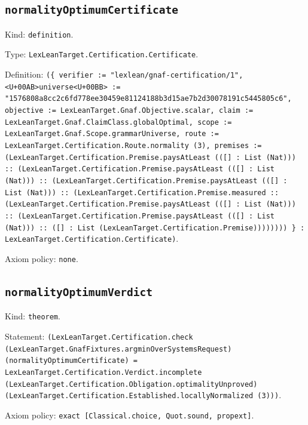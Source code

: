 \documentclass[11pt]{article}
\begin{document}
\subsection*{\texttt{normalityOptimumCertificate}}
\noindent Kind: \texttt{definition}.\par
\noindent Type: \texttt{LexLeanTarget.Certification.Certificate}.\par
\noindent Definition: \texttt{(\{ verifier := "lexlean/gnaf-certification/1", <U+00AB>universe<U+00BB> := "1576808a8cc2c6fd778ee30459e81124188b3d15ae7b2d30078191c5445805c6", objective := LexLeanTarget.Gnaf.Objective.scalar, claim := LexLeanTarget.Gnaf.ClaimClass.globalOptimal, scope := LexLeanTarget.Gnaf.Scope.grammarUniverse, route := LexLeanTarget.Certification.Route.normality (3), premises := (LexLeanTarget.Certification.Premise.paysAtLeast (([] : List (Nat))) :: (LexLeanTarget.Certification.Premise.paysAtLeast (([] : List (Nat))) :: (LexLeanTarget.Certification.Premise.paysAtLeast (([] : List (Nat))) :: (LexLeanTarget.Certification.Premise.measured :: (LexLeanTarget.Certification.Premise.paysAtLeast (([] : List (Nat))) :: (LexLeanTarget.Certification.Premise.paysAtLeast (([] : List (Nat))) :: ([] : List (LexLeanTarget.Certification.Premise)))))))) \} : LexLeanTarget.Certification.Certificate)}.\par
\noindent Axiom policy: \texttt{none}.\par
\subsection*{\texttt{normalityOptimumVerdict}}
\noindent Kind: \texttt{theorem}.\par
\noindent Statement: \texttt{(LexLeanTarget.Certification.check (LexLeanTarget.GnafFixtures.argminOverSystemsRequest) (normalityOptimumCertificate) = LexLeanTarget.Certification.Verdict.incomplete (LexLeanTarget.Certification.Obligation.optimalityUnproved) (LexLeanTarget.Certification.Established.locallyNormalized (3)))}.\par
\noindent Axiom policy: \texttt{exact [Classical.choice, Quot.sound, propext]}.\par
\end{document}
